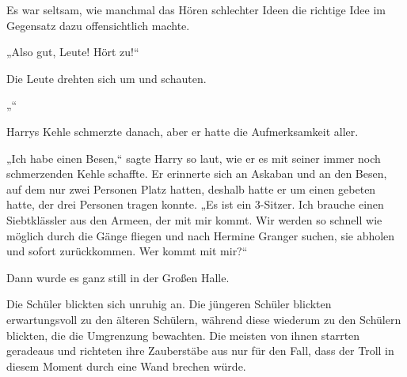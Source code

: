Es war seltsam, wie manchmal das Hören schlechter Ideen die richtige Idee im Gegensatz dazu offensichtlich machte.

„Also gut, Leute! Hört zu!“

Die Leute drehten sich um und schauten.

„“

Harrys Kehle schmerzte danach, aber er hatte die Aufmerksamkeit aller.

„Ich habe einen Besen,“ sagte Harry so laut, wie er es mit seiner immer noch schmerzenden Kehle schaffte. Er erinnerte sich an Askaban und an den Besen, auf dem nur zwei Personen Platz hatten, deshalb hatte er um einen gebeten hatte, der drei Personen tragen konnte. „Es ist ein 3-Sitzer. Ich brauche einen Siebtklässler aus den Armeen, der mit mir kommt. Wir werden so schnell wie möglich durch die Gänge fliegen und nach Hermine Granger suchen, sie abholen und sofort zurückkommen. Wer kommt mit mir?“

Dann wurde es ganz still in der Großen Halle.

\later

Die Schüler blickten sich unruhig an. Die jüngeren Schüler blickten erwartungsvoll zu den älteren Schülern, während diese wiederum zu den Schülern blickten, die die Umgrenzung bewachten. Die meisten von ihnen starrten geradeaus und richteten ihre Zauberstäbe aus nur für den Fall, dass der Troll in diesem Moment durch eine Wand brechen würde.


